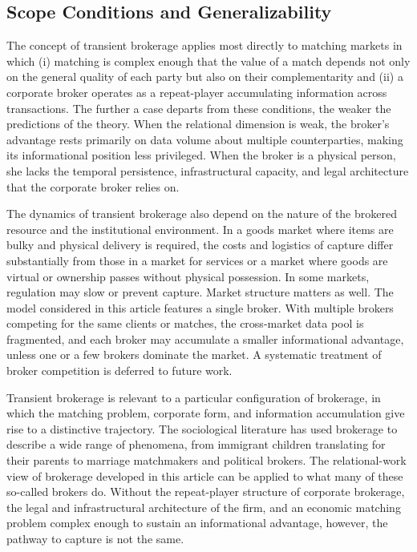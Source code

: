 \documentclass[
]{article}
\begin{document}
\subsection{Scope Conditions and Generalizability}

The concept of transient brokerage applies most directly to matching markets in which (i) matching is complex enough that the value of a match depends not only on the general quality of each party but also on their complementarity and (ii) a corporate broker operates as a repeat-player accumulating information across transactions. The further a case departs from these conditions, the weaker the predictions of the theory. When the relational dimension is weak, the broker's advantage rests primarily on data volume about multiple counterparties, making its informational position less privileged. When the broker is a physical person, she lacks the temporal persistence, infrastructural capacity, and legal architecture that the corporate broker relies on.

The dynamics of transient brokerage also depend on the nature of the brokered resource and the institutional environment. In a goods market where items are bulky and physical delivery is required, the costs and logistics of capture differ substantially from those in a market for services or a market where goods are virtual or ownership passes without physical possession. In some markets, regulation may slow or prevent capture. Market structure matters as well. The model considered in this article features a single broker. With multiple brokers competing for the same clients or matches, the cross-market data pool is fragmented, and each broker may accumulate a smaller informational advantage, unless one or a few brokers dominate the market. A systematic treatment of broker competition is deferred to future work.

Transient brokerage is relevant to a particular configuration of brokerage, in which the matching problem, corporate form, and information accumulation give rise to a distinctive trajectory. The sociological literature has used brokerage to describe a wide range of phenomena, from immigrant children translating for their parents to marriage matchmakers and political brokers. The relational-work view of brokerage developed in this article can be applied to what many of these so-called brokers do. Without the repeat-player structure of corporate brokerage, the legal and infrastructural architecture of the firm, and an economic matching problem complex enough to sustain an informational advantage, however, the pathway to capture is not the same.
\end{document}
